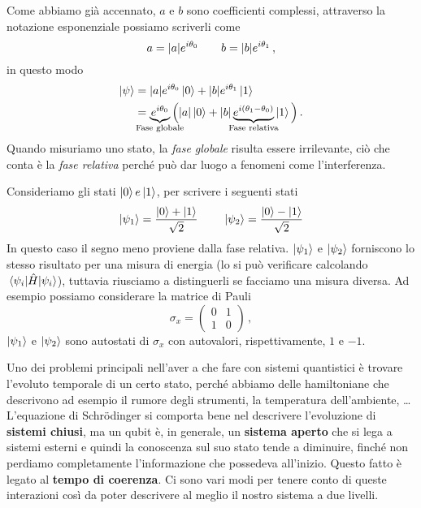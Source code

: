 Come abbiamo già accennato, $a$ e $b$ sono coefficienti complessi, attraverso la notazione esponenziale possiamo scriverli come
\begin{equation*}
    a=\abs{a}e^{i\theta_0} \qquad b=\abs{b}e^{i\theta_1}\, ,
\end{equation*}
in questo modo
\begin{equation*}
    \begin{aligned}
        \ket \psi &= \abs{a}e^{i\theta_0}\ket 0 + \abs{b}e^{i\theta_1}\ket 1 \\
                  &= \underbrace{e^{i\theta_0}}_{\mathclap{\text{Fase globale}}}\Big(\abs{a}\ket 0 + \abs{b}\underbrace{e^{i\left(\theta_1-\theta_0\right)}}_{\mathclap{\text{Fase relativa}}}\ket 1\Big) \, .
    \end{aligned}
\end{equation*}
Quando misuriamo uno stato, la \textit{fase globale} risulta essere irrilevante, ciò che conta è la \textit{fase relativa} perché può dar luogo a fenomeni come l'interferenza.
\begin{esempio}
    Consideriamo gli stati $\ket 0 e \ket 1$, per scrivere i seguenti stati
    \begin{equation*}
        \ket{\psi_1}=\frac{\ket 0 + \ket 1}{\sqrt 2}\, \qquad \ket{\psi_2}=\frac{\ket 0 - \ket 1}{\sqrt 2} 
    \end{equation*}
    In questo caso il segno meno proviene dalla fase relativa. $\ket{\psi_1}$ e $\ket{\psi_2}$ forniscono lo stesso risultato per una misura di energia (lo si può verificare calcolando $\mel{\psi_i}{\hat H}{\psi_i}$), tuttavia riusciamo a distinguerli se facciamo una misura diversa. Ad esempio possiamo considerare la matrice di Pauli
    \begin{equation*}
        \sigma_x = \begin{pmatrix}
                    0 & 1 \\
                    1 & 0
                   \end{pmatrix}\, ,
    \end{equation*}
    $\ket{\psi_1}$ e $\ket{\psi_2}$ sono autostati di $\sigma_x$ con autovalori, rispettivamente, $1$ e $-1$.
\end{esempio}
\noindent Uno dei problemi principali nell'aver a che fare con sistemi quantistici è trovare l'evoluto temporale di un certo stato, perché abbiamo delle hamiltoniane che descrivono ad esempio il rumore degli strumenti, la temperatura dell'ambiente, \dots L'equazione di Schrödinger si comporta bene nel descrivere l'evoluzione di \textbf{sistemi chiusi}, ma un qubit è, in generale, un \textbf{sistema aperto} che si lega a sistemi esterni e quindi la conoscenza sul suo stato tende a diminuire, finché non perdiamo completamente l'informazione che possedeva all'inizio. Questo fatto è legato al \textbf{tempo di coerenza}. Ci sono vari modi per tenere conto di queste interazioni così da poter descrivere al meglio il nostro sistema a due livelli.\\
